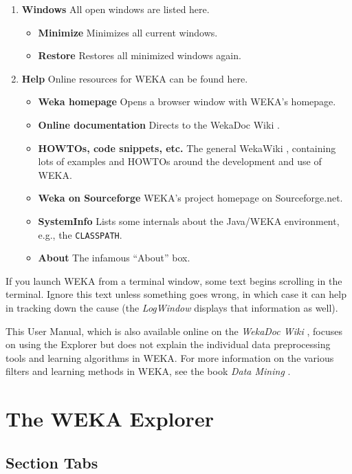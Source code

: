 \documentclass[a4paper]{article}
\begin{document}
\begin{enumerate}
	\item \textbf{Windows} All open windows are listed here.
		\begin{itemize}
			\item \textbf{Minimize} Minimizes all current windows.
			\item \textbf{Restore} Restores all minimized windows again.
		\end{itemize}
		
	\item \textbf{Help} Online resources for WEKA can be found here.
		\begin{itemize}
			\item \textbf{Weka homepage} Opens a browser window with WEKA's homepage.
			\item \textbf{Online documentation} Directs to the WekaDoc Wiki \cite{wekadoc}.
			\item \textbf{HOWTOs, code snippets, etc.} The general WekaWiki \cite{wekawiki}, containing lots of examples and HOWTOs around the development and use of WEKA.
			\item \textbf{Weka on Sourceforge} WEKA's project homepage on Sourceforge.net.
			\item \textbf{SystemInfo} Lists some internals about the Java/WEKA environment, e.g., the \texttt{CLASSPATH}.
			\item \textbf{About} The infamous ``About'' box.
		\end{itemize}
\end{enumerate}

If you launch WEKA from a terminal window, some text begins scrolling in the
terminal. Ignore this text unless something goes wrong, in which case it can
help in tracking down the cause (the \textit{LogWindow} displays that information as well).

This User Manual, which is also available online on the \textit{WekaDoc Wiki} 
\cite{wekadoc}, focuses on using the Explorer but does not explain
the individual data preprocessing tools and learning algorithms in
WEKA. For more information on the various filters and learning methods
in WEKA, see the book {\em Data Mining} \cite{witten}.

\newpage

\section{The WEKA Explorer}

\subsection{Section Tabs}
\end{document}
